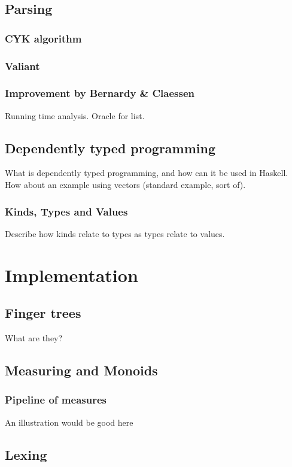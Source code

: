 \documentclass[a4paper,12pt,twosided]{report}
\begin{document}
\section{Parsing}
\subsection{CYK algorithm}
\subsection{Valiant}
\subsection{Improvement by Bernardy \& Claessen}
Running time analysis. Oracle for list.

\section{Dependently typed programming}
What is dependently typed programming, and how can it be used in Haskell. How
about an example using vectors (standard example, sort of).
\subsection{Kinds, Types and Values}
Describe how kinds relate to types as types relate to values.

%
%

\chapter{Implementation}

\section{Finger trees}
What are they?
\section{Measuring and Monoids}

\subsection{Pipeline of measures}
An illustration would be good here

\section{Lexing}
\end{document}
